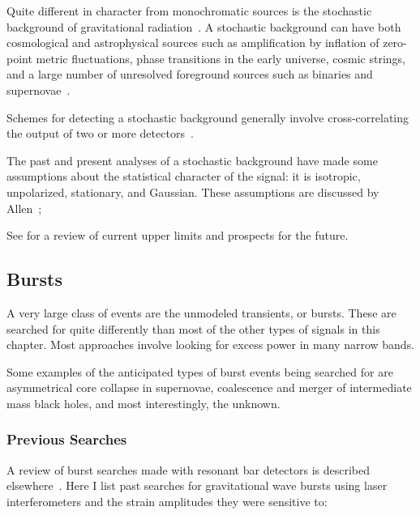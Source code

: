 Quite different in character from monochromatic sources is the
stochastic background of gravitational radiation~\cite{S1:Stochastic}.
A stochastic background can have both cosmological and
astrophysical sources such as amplification by inflation of zero-point 
metric fluctuations, phase transitions in the 
early universe, cosmic strings, and a large number of unresolved foreground
sources such as binaries and supernovae~\cite{Bruce:Houches}.

Schemes for detecting a stochastic background generally involve
cross-correlating the output of two or more 
detectors~\cite{Nelson:Thesis,Nelson:SB,Bruce:Houches,S1:Stochastic}. 

The past and present analyses of a stochastic background have made some assumptions about
the statistical character of the signal: it is isotropic, unpolarized,
stationary, and Gaussian. These assumptions are discussed 
by Allen~\cite{Bruce:Stochastic};

See \cite{S1:Stochastic} for a review of current upper limits and
prospects for the future.



\subsection{Bursts}

A very large class of events are the unmodeled transients, or bursts. These
are searched for quite differently than most of the other types of signals
in this chapter. Most approaches involve looking for excess power in many
narrow bands.

Some examples of the anticipated types of burst events being searched for are
asymmetrical core collapse in supernovae, coalescence and merger of intermediate
mass black holes, and most interestingly, the unknown.


\subsubsection{Previous Searches}

A review of burst searches made with resonant bar detectors is described
elsewhere~\cite{Bars:Status,Tyson:1982}. Here I list past searches for
gravitational wave bursts using laser interferometers and the strain
amplitudes they were sensitive to:


